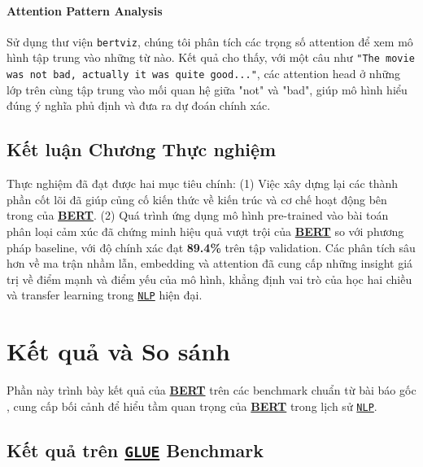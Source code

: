     \paragraph{Attention Pattern Analysis}
    Sử dụng thư viện \texttt{bertviz}, chúng tôi phân tích các trọng số attention để xem mô hình tập trung vào những từ nào. Kết quả cho thấy, với một câu như \texttt{"The movie was not bad, actually it was quite good..."}, các attention head ở những lớp trên cùng tập trung vào mối quan hệ giữa "not" và "bad", giúp mô hình hiểu đúng ý nghĩa phủ định và đưa ra dự đoán chính xác.
    
    \subsection{Kết luận Chương Thực nghiệm}
    \label{ssec:ket_luan_chuong_thuc_nghiem}
    Thực nghiệm đã đạt được hai mục tiêu chính: (1) Việc xây dựng lại các thành phần cốt lõi đã giúp củng cố kiến thức về kiến trúc và cơ chế hoạt động bên trong của \hyperref[acro:bert]{\textbf{BERT}}. (2) Quá trình ứng dụng mô hình pre-trained vào bài toán phân loại cảm xúc đã chứng minh hiệu quả vượt trội của \hyperref[acro:bert]{\textbf{BERT}} so với phương pháp baseline, với độ chính xác đạt \textbf{89.4\%} trên tập validation. Các phân tích sâu hơn về ma trận nhầm lẫn, embedding và attention đã cung cấp những insight giá trị về điểm mạnh và điểm yếu của mô hình, khẳng định vai trò của học hai chiều và transfer learning trong \hyperref[acro:nlp]{\texttt{NLP}} hiện đại.
    
    \section{Kết quả và So sánh}
    \label{sec:ket_qua_so_sanh}
    
    Phần này trình bày kết quả của \hyperref[acro:bert]{\textbf{BERT}} trên các benchmark chuẩn từ bài báo gốc \cite{devlin2018bert}, cung cấp bối cảnh để hiểu tầm quan trọng của \hyperref[acro:bert]{\textbf{BERT}} trong lịch sử \hyperref[acro:nlp]{\texttt{NLP}}.
    
    \subsection{Kết quả trên \hyperref[acro:glue]{\texttt{GLUE}} Benchmark}
    \label{ssec:ket_qua_glue}
    
